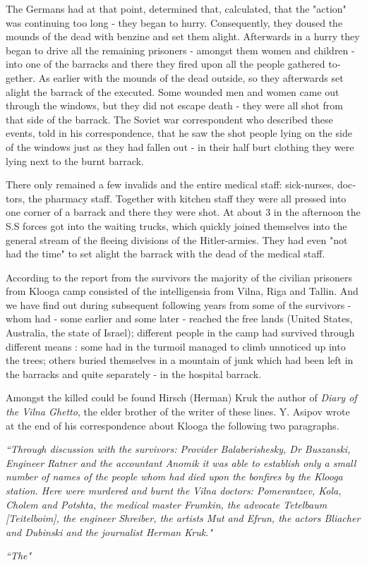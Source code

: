 \documentclass{article}
\begin{document}
\begin{pairs}
\begin{Leftside}
\begin{english}
The Germans had at that point, determined that, calculated, that the "action" was continuing too long - they began to hurry.
Consequently, they doused the mounds of the dead with benzine and set them alight. Afterwards in a hurry they began 
to drive all the remaining prisoners - amongst them women and children - into one of the barracks and there they 
fired upon all the people gathered together. As earlier with the mounds of the dead outside, so they afterwards set alight
the barrack of the executed. Some wounded men and women came out through the windows, but they did not escape
death - they were all shot from that side of the barrack. The Soviet war correspondent who described these events,
told in his correspondence, that he saw the shot people lying on the side of the windows just as they had fallen out -
in their half burt clothing they were lying next to the burnt barrack.

There only remained a few invalids and the entire medical staff: sick-nurses, doctors, the pharmacy staff. Together with kitchen
staff they were all pressed into one corner of a barrack and there they were shot.  At about 3 in the afternoon the S.S forces 
got into the waiting trucks, which quickly joined themselves into the general stream of the fleeing divisions of the Hitler-armies.
They had even "not had the time" to set alight the barrack with the dead of the medical staff.

According to the report from the survivors the majority of the civilian prisoners from Klooga camp consisted of the intelligensia
from Vilna, Riga and Tallin. And we have find out during subsequent following years from some of the survivors - 
whom had - some earlier and some later - reached the free lands (United States, Australia, the state of Israel);
different people in the camp had survived through different means : some had in the turmoil managed to climb
unnoticed up into the trees; others buried themselves in a mountain of junk which had been left in the barracks and 
quite separately -  in the hospital barrack.

Amongst the killed could be found Hirsch (Herman) Kruk the author of \emph{Diary of the Vilna Ghetto}, the
elder brother of the writer of these lines. Y. Asipov wrote at the end of his correspondence about Klooga the following
two paragraphs.

\emph{
``Through discussion with the survivors: Provider Balaberishesky, Dr Buszanski, Engineer Ratner and the accountant Anomik
it was able to establish only a small number of names of the people whom had died upon the bonfires
by the Klooga station. Here were murdered and burnt the Vilna doctors: Pomerantzev, Kola, Cholem and Potshta, the
medical master Frumkin, the advocate Tetelbaum [Teitelboim], the engineer Shreiber, the artists Mut and Efrun, the actors
Bliacher and Dubinski and the journalist Herman Kruk."}

\emph{
``The"}

\endnumbering
\end{english}
\end{Leftside}

\end{pairs}
\Columns
\end{document}
